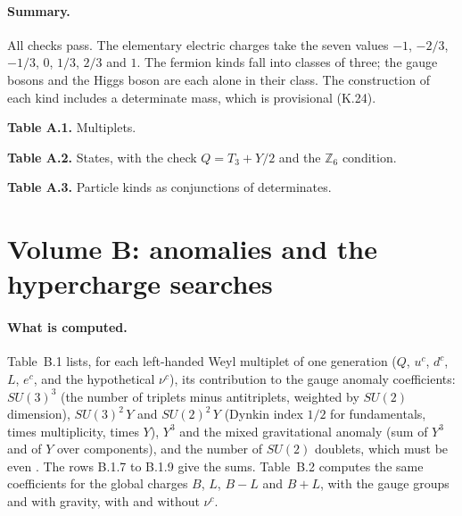 \paragraph{Summary.} All checks pass. The elementary electric charges take the seven values $-1$, $-2/3$, $-1/3$, $0$, $1/3$, $2/3$ and $1$. The fermion kinds fall into \vvNFermClasses{} classes of three; the gauge bosons and the Higgs boson are each alone in their class. The construction of each kind includes a determinate mass, which is provisional (K.24).

\begin{center}\textbf{Table A.1.} Multiplets.\end{center}


\begin{center}\textbf{Table A.2.} States, with the check $Q = T_3 + Y/2$ and the $\mathbb{Z}_6$ condition.\end{center}


\begin{center}\textbf{Table A.3.} Particle kinds as conjunctions of determinates.\end{center}


\section{Volume B: anomalies and the hypercharge searches}\label{app:b}

\paragraph{What is computed.} Table~B.1 lists, for each left-handed Weyl multiplet of one generation ($Q$, $u^c$, $d^c$, $L$, $e^c$, and the hypothetical $\nu^c$), its contribution to the gauge anomaly coefficients: $SU(3)^3$ (the number of triplets minus antitriplets, weighted by $SU(2)$ dimension), $SU(3)^2\,Y$ and $SU(2)^2\,Y$ (Dynkin index $1/2$ for fundamentals, times multiplicity, times $Y$), $Y^3$ and the mixed gravitational anomaly (sum of $Y^3$ and of $Y$ over components), and the number of $SU(2)$ doublets, which must be even \citep{Witten1982}. The rows B.1.7 to B.1.9 give the sums. Table~B.2 computes the same coefficients for the global charges $B$, $L$, $B-L$ and $B+L$, with the gauge groups and with gravity, with and without $\nu^c$.

